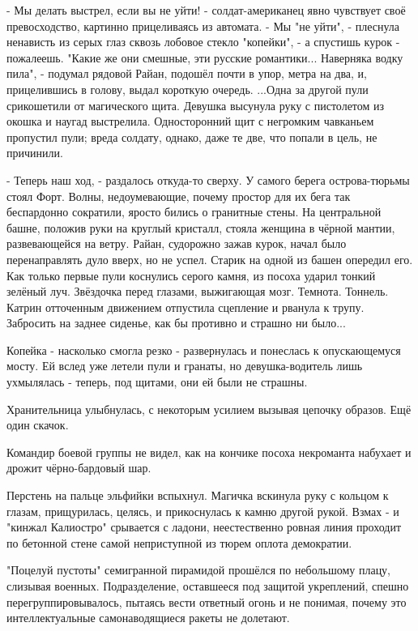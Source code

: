 
 - Мы делать выстрел, если вы не уйти! - солдат-американец явно чувствует своё превосходство, картинно прицеливаясь из автомата.
 - Мы "не уйти", - плеснула ненависть из серых глаз сквозь лобовое стекло "копейки", - а спустишь курок - пожалеешь.
"Какие же они смешные, эти русские романтики... Наверняка водку пила", - подумал рядовой Райан, подошёл почти в упор, метра на два, и, прицелившись в голову, выдал короткую очередь.
...Одна за другой пули срикошетили от магического щита. Девушка высунула руку с пистолетом из окошка и наугад выстрелила. Односторонний щит с негромким чавканьем пропустил пули; вреда солдату, однако, даже те две, что попали в цель, не причинили.

 - Теперь наш ход, - раздалось откуда-то сверху. У самого берега острова-тюрьмы стоял Форт. Волны, недоумевающие, почему простор для их бега так беспардонно сократили, яросто бились о гранитные стены. На центральной башне, положив руки на круглый кристалл, стояла женщина в чёрной мантии, развевающейся на ветру.
Райан, судорожно зажав курок, начал было перенаправлять дуло вверх, но не успел. Старик на одной из башен опередил его. Как только первые пули коснулись серого камня, из посоха ударил тонкий зелёный луч. Звёздочка перед глазами, выжигающая мозг. Темнота. Тоннель.
Катрин отточенным движением отпустила сцепление и рванула к трупу. Забросить на заднее сиденье, как бы противно и страшно ни было...

Копейка - насколько смогла резко - развернулась и понеслась к опускающемуся мосту. Ей вслед уже летели пули и гранаты, но девушка-водитель лишь ухмылялась - теперь, под щитами, они ей были не страшны.

Хранительница улыбнулась, с некоторым усилием вызывая цепочку образов. Ещё один скачок.

Командир боевой группы не видел, как на кончике посоха некроманта набухает и дрожит чёрно-бардовый шар.

Перстень на пальце эльфийки вспыхнул. Магичка вскинула руку с кольцом к глазам, прищурилась, целясь, и прикоснулась к камню другой рукой. Взмах - и "кинжал Калиостро" срывается с ладони, неестественно ровная линия проходит по бетонной стене самой неприступной из тюрем оплота демократии.

"Поцелуй пустоты" семигранной пирамидой прошёлся по небольшому плацу, слизывая военных. Подразделение, оставшееся под защитой укреплений, спешно перегруппировывалось, пытаясь вести ответный огонь и не понимая, почему это интеллектуальные самонаводящиеся ракеты не долетают.

